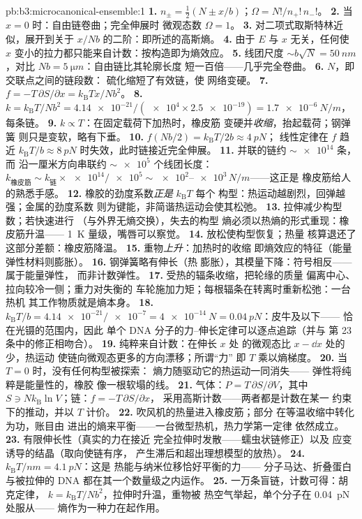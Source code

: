 \begin{solution}{pb:b3:microcanonical-ensemble:1}
\textbf{1.} $n_\pm = \tfrac12(N \pm x/b)$；$\Omega =
N!/n_+!\,n_-!$。
\textbf{2.} 当 $x = 0$ 时：自由链卷曲；完全伸展时
微观态数 $\Omega = 1$。
\textbf{3.} 对二项式取斯特林近似，展开到关于
$x/Nb$ 的二阶：即所述的高斯熵。
\textbf{4.} 由于 $E$ 与 $x$ 无关，任何使
$x$ 变小的拉力都只能来自计数：按构造即为熵效应。
\textbf{5.} 线团尺度 $\sim b\sqrt N = \qty{50}{nm}$，对比 $Nb =
\qty{5}{\micro m}$：自由链比其轮廓长度
短一百倍——几乎完全卷曲。
\textbf{6.} $N$，即交联点之间的链段数：
硫化缩短了有效链，使
网络变硬。
\textbf{7.} $f = -T\,\partial S/\partial x =
k_{\text{B}}Tx/Nb^2$。
\textbf{8.} $k = k_{\text{B}}T/Nb^2 = \num{4.14e-21}/(\num{e4}
\times \num{2.5e-19}) = \qty{1.7e-6}{N/m}$，每条链。
\textbf{9.} $k \propto T$：在固定载荷下加热时，橡皮筋
变硬并\emph{收缩}，抬起载荷；钢弹簧
则只是变软，略有下垂。
\textbf{10.} $f(Nb/2) = k_{\text{B}}T/2b \approx \qty{4}{pN}$；
线性定律在 $f$ 趋近 $k_{\text{B}}T/b \approx
\qty{8}{pN}$ 时失效，此时链接近完全伸展。
\textbf{11.} 并联的链约 $\sim\num{e14}$ 条，而
沿一厘米方向串联约 $\sim\num{e5}$ 个线团长度：
$k_{\text{橡皮筋}} \sim k_{\text{链}} \times \num{e14}/\num{e5}
\sim \num{e2}$--$\num{e3}\,\unit{N/m}$——这正是
橡皮筋给人的熟悉手感。
\textbf{12.} 橡胶的劲度系数\emph{正是} $k_{\text{B}}T$ 每个
构型：热运动越剧烈，回弹越强；金属的劲度系数
则为键能，非简谐热运动会使其松弛。
\textbf{13.} 拉伸减少构型数；若快速进行
（与外界无熵交换），失去的构型
熵必须以热熵的形式重现：橡皮筋升温——
\qty{1}{K} 量级，嘴唇可以察觉。
\textbf{14.} 放松使构型恢复；热量
核算退还了这部分差额：橡皮筋降温。
\textbf{15.} 重物\emph{上升}：加热时的收缩
即熵效应的特征（能量弹性材料则膨胀）。
\textbf{16.} 钢弹簧略有伸长（热
膨胀），其模量下降：符号相反——属于能量弹性，
而非计数弹性。
\textbf{17.} 受热的辐条收缩，把轮缘的质量
偏离中心、拉向较冷一侧；重力对失衡的
车轮施加力矩；每根辐条在转离时重新松弛：一台热机
其工作物质就是熵本身。
\textbf{18.} $k_{\text{B}}T/b = \num{4.14e-21}/\num{e-7} =
\qty{4e-14}{N} = \qty{0.04}{pN}$：皮牛及以下——
恰在光镊的范围内，因此
单个 DNA 分子的力–伸长定律可以逐点追踪（并与
第 23 条中的修正相吻合）。
\textbf{19.} 纯粹来自计数：在伸长 $x$ 处
的微观态比 $x - \dd x$ 处的少，热运动
使链向微观态更多的方向漂移；所谓“力”
即 $T$ 乘以熵梯度。
\textbf{20.} 当 $T = 0$ 时，没有任何构型被探索：
熵力随驱动它的热运动一同消失——
弹性将纯粹是能量性的，橡胶
像一根软塌的线。
\textbf{21.} 气体：$P = T\,\partial S/\partial V$，其中 $S \ni
Nk_{\text{B}}\ln V$；链：$f = -T\,\partial S/\partial x$，
采用高斯计数——两者都是计数在某一
约束下的推动，并以 $T$ 计价。
\textbf{22.} 吹风机的热量进入橡皮筋；部分
在等温收缩中转化为功，账目由
进出的熵来平衡——一台微型热机，热力学第一定律
依然成立。
\textbf{23.} 有限伸长性（真实的力在接近
完全拉伸时发散——蠕虫状链修正）以及
应变诱导的结晶（取向使链有序，
产生滞后和超出理想模型的放热）。
\textbf{24.} $k_{\text{B}}T/\unit{nm} = \qty{4.1}{pN}$：这是
热能与纳米位移恰好平衡的力——
分子马达、折叠蛋白与被拉伸的 DNA
都在其一个数量级之内运作。
\textbf{25.} 一万条盲链，计数可得：胡克定律，
$k = k_{\text{B}}T/Nb^2$，拉伸时升温，重物被
热空气举起，单个分子在 \qty{0.04}{pN} 处服从——
熵作为一种力在起作用。
\end{solution}
